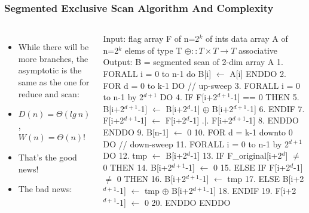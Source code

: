 \documentclass{beamer}
\renewcommand{\emph}[1]{\textcolor{CosGreen}{ #1}}
\newcommand{\emp}[1]{\textcolor{DikuRed}{ #1}}
\newcommand{\mymath}[1]{$ #1 $}
\newcommand{\myindu}[1]{^{#1}}
\begin{document}
\begin{frame}[fragile,t]
  \frametitle{Segmented Exclusive Scan Algorithm And Complexity}
\vspace{-1ex}
\begin{columns}
\begin{itemize} 
    \item While there will be more branches, the asymptotic
            is the same as the one for reduce and scan:
    \item \emph{$D(n) = \Theta(lg \ n)$},\\\emp{$W(n) = \Theta(n)$!}
    \item That's the good news!
    \item The bad news:
\end{itemize}\pause
{}
\begin{colorcode}[fontsize=\scriptsize]
Input:  flag array F of n=2\mymath{\myindu{k}} of ints
        data array A of n=2\mymath{\myindu{k}} elems of type T
        \mymath{\oplus::T\times T\rightarrow T} associative
Output: B = segmented scan of 2-dim array A
1.  \emph{FORALL i = 0 to n-1 do} B[i] \mymath{\leftarrow} A[i] \emph{ENDDO}
2.  \emp{FOR d = 0 to k-1 DO} \emph{// up-sweep}
3.    \emph{FORALL i = 0 to n-1 by 2\mymath{\myindu{d+1}} DO} 
4.      IF F[i+2\mymath{\myindu{d+1}}-1] == 0 THEN 
5.          B[i+2\mymath{\myindu{d+1}}-1] \mymath{\leftarrow} B[i+2\mymath{\myindu{d}}-1] \mymath{\oplus} B[i+2\mymath{\myindu{d+1}}-1]
6.      ENDIF
7.      F[i+2\mymath{\myindu{d+1}}-1] \mymath{\leftarrow} F[i+2\mymath{\myindu{d}}-1] .|. F[i+2\mymath{\myindu{d+1}}-1]
8.  \emp{ENDDO} \emph{ENDDO}
9.  B[n-1] \mymath{\leftarrow} 0
10. \emp{FOR d = k-1 downto 0 DO} \emph{// down-sweep}
11.   \emph{FORALL i = 0 to n-1 by 2\mymath{\myindu{d+1}} DO} 
12.     tmp \mymath{\leftarrow} B[i+2\mymath{\myindu{d}}-1]
13.     IF \alert{F\_original}[i+2\mymath{\myindu{d}}] \mymath{\neq} 0 THEN
14.          B[i+2\mymath{\myindu{d+1}}-1] \mymath{\leftarrow} 0
15.     ELSE IF F[i+2\mymath{\myindu{d}}-1] \mymath{\neq} 0 THEN
16.          B[i+2\mymath{\myindu{d+1}}-1] \mymath{\leftarrow} tmp
17.     ELSE B[i+2\mymath{\myindu{d+1}}-1] \mymath{\leftarrow} tmp \mymath{\oplus} B[i+2\mymath{\myindu{d+1}}-1]
18.     ENDIF
19.     F[i+2\mymath{\myindu{d+1}}-1] \mymath{\leftarrow} 0
20. \emp{ENDDO} \emph{ENDDO}
\end{colorcode}
\end{columns}

\end{frame}
\end{document}
